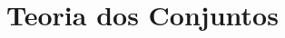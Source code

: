 \documentclass[../../main]{subfiles}
\begin{document}
    \section{Teoria dos Conjuntos}\label{section:teoria-dos-conjuntos}

    
\end{document}
